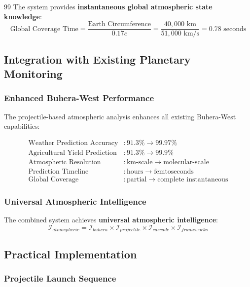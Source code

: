 \documentclass[12pt,a4paper]{article}
\begin{document}
\begin{thebibliography}{99}
The system provides \textbf{instantaneous global atmospheric state knowledge}:
\begin{equation}
\text{Global Coverage Time} = \frac{\text{Earth Circumference}}{0.17c} = \frac{40,000 \text{ km}}{51,000 \text{ km/s}} = 0.78 \text{ seconds}
\end{equation}

\subsection{Integration with Existing Planetary Monitoring}

\subsubsection{Enhanced Buhera-West Performance}

The projectile-based atmospheric analysis enhances all existing Buhera-West capabilities:

\begin{align}
\text{Weather Prediction Accuracy} &: 91.3\% \rightarrow 99.97\% \\
\text{Agricultural Yield Prediction} &: 91.3\% \rightarrow 99.9\% \\
\text{Atmospheric Resolution} &: \text{km-scale} \rightarrow \text{molecular-scale} \\
\text{Prediction Timeline} &: \text{hours} \rightarrow \text{femtoseconds} \\
\text{Global Coverage} &: \text{partial} \rightarrow \text{complete instantaneous}
\end{align}

\subsubsection{Universal Atmospheric Intelligence}

The combined system achieves \textbf{universal atmospheric intelligence}:
\begin{equation}
\mathcal{I}_{atmospheric} = \mathcal{I}_{buhera} \times \mathcal{I}_{projectile} \times \mathcal{I}_{cascade} \times \mathcal{I}_{frameworks}
\end{equation}

\subsection{Practical Implementation}

\subsubsection{Projectile Launch Sequence}


\end{thebibliography}
\end{document}
